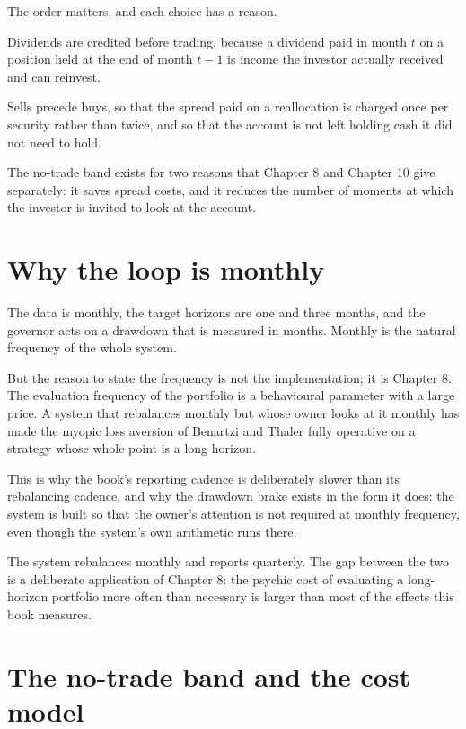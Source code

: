 The order matters, and each choice has a reason.

Dividends are credited before trading, because a dividend paid in month
\(t\) on a position held at the end of month \(t-1\) is income the
investor actually received and can reinvest.

Sells precede buys, so that the spread paid on a reallocation is charged
once per security rather than twice, and so that the account is not left
holding cash it did not need to hold.

The no-trade band exists for two reasons that Chapter 8 and Chapter 10
give separately: it saves spread costs, and it reduces the number of
moments at which the investor is invited to look at the account.

\section{Why the loop is monthly}

The data is monthly, the target horizons are one and three months, and the
governor acts on a drawdown that is measured in months. Monthly is the
natural frequency of the whole system.

But the reason to state the frequency is not the implementation; it is
Chapter 8. The evaluation frequency of the portfolio is a behavioural
parameter with a large price. A system that rebalances monthly but whose
owner looks at it monthly has made the myopic loss aversion of
Benartzi and Thaler fully operative on a strategy whose whole point is a
long horizon.

This is why the book's reporting cadence is deliberately slower than its
rebalancing cadence, and why the drawdown brake exists in the form it
does: the system is built so that the owner's attention is not required
at monthly frequency, even though the system's own arithmetic runs there.

\begin{takeaway}
The system rebalances monthly and reports quarterly. The gap between the
two is a deliberate application of Chapter 8: the psychic cost of
evaluating a long-horizon portfolio more often than necessary is larger
than most of the effects this book measures.
\end{takeaway}

\section{The no-trade band and the cost model}


